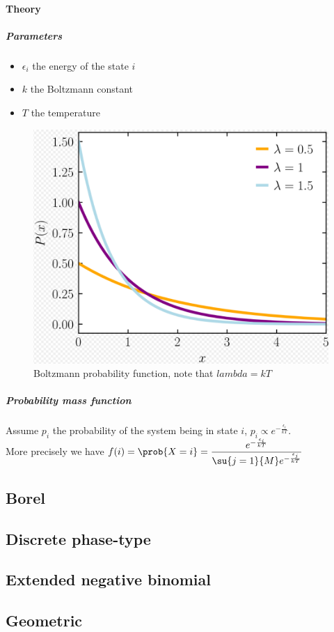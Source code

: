 \paragraph{Theory}
\subparagraph{Parameters}
\begin{itemize}
    \item $\epsilon_{i}$ the energy of the state $i$
    \item $k$ the Boltzmann constant 
    \item $T$ the temperature
\end{itemize}
\begin{figure}[H]
    \begin{center}
        \includegraphics[width=.5\textwidth]{./chapters/2_statistics/02_common_probability_distributions/images/06_boltzman_pmf.png}
    \end{center}
    \caption{Boltzmann probability function, note that $lambda = kT$}
    \label{fig:06_boltzman_pmf}
\end{figure}

\subparagraph{Probability mass function}
Assume $p_{i}$ the probability of the system being in state $i$, 
$p_{i}\propto e^{-\frac{\epsilon_{i}}{kT}}$.\\ 
More precisely we have $f(i) = \prob{X=i} = \dfrac{e^{-\frac{\epsilon_{i}}{kT}}}{\su{j=1}{M}e^{-\frac{\epsilon_{j}}{kT}}}$


\subsection{Borel}
\subsection{Discrete phase-type}
\subsection{Extended negative binomial}
\subsection{Geometric}
